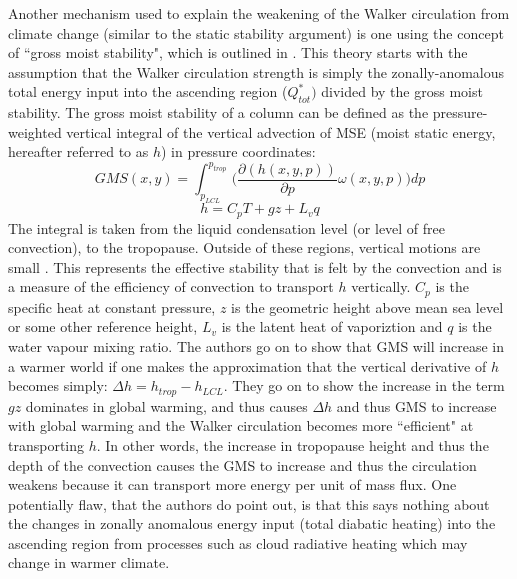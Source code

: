 \documentclass[letterpaper,12pt,titlepage,oneside,final]{book}
\begin{document}
Another mechanism used to explain the weakening of the Walker circulation from climate change (similar to the static stability argument) is one using the concept of ``gross moist stability", which is outlined in \cite{wills_local_2017}. This theory starts with the assumption that the Walker circulation strength is simply the zonally-anomalous total energy input into the ascending region ($Q_{tot}^{*})$ divided by the gross moist stability. The gross moist stability of a column can be defined as the pressure-weighted vertical integral of the vertical advection of MSE (moist static energy, hereafter referred to as $h$) in pressure coordinates:
\begin{equation}\label{eq:GMS}
GMS(x,y) = \int_{p_{LCL}}^{p_{trop}}\bigg(\frac{\partial({h(x,y,p)})}{\partial{p}}\omega(x,y,p)\bigg){dp}
\end{equation}
\begin{equation}\label{eq:MSE}
h=C_{p}T + gz + L_{v}q
\end{equation}
The integral is taken from the liquid condensation level (or level of free convection), to the tropopause. Outside of these regions, vertical motions are small \cite{wills_local_2017}. This represents the effective stability that is felt by the convection and is a measure of the efficiency of convection to transport $h$ vertically. $C_{p}$ is the specific heat at constant pressure, $z$ is the geometric height above mean sea level or some other reference height, $L_{v}$ is the latent heat of vaporiztion and $q$ is the water vapour mixing ratio. The authors go on to show that GMS will increase in a warmer world if one makes the approximation that the vertical derivative of $h$ becomes simply: $\Delta{h} = h_{trop} - h_{LCL}$. They go on to show the increase in the term $gz$ dominates in global warming, and thus causes $\Delta{h}$ and thus GMS to increase with global warming and the Walker circulation becomes more ``efficient" at transporting $h$. In other words, the increase in tropopause height and thus the depth of the convection causes the GMS to increase and thus the circulation weakens because it can transport more energy per unit of mass flux. One potentially flaw, that the authors do point out, is that this says nothing about the changes in zonally anomalous energy input (total diabatic heating) into the ascending region from processes such as cloud radiative heating which may change in warmer climate.
\end{document}
